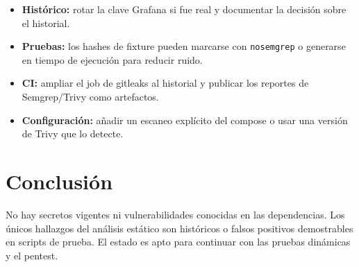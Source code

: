 \documentclass[11pt]{article}
\begin{document}
\begin{itemize}
  \item \textbf{Histórico:} rotar la clave Grafana si fue real y documentar la
  decisión sobre el historial.
  \item \textbf{Pruebas:} los hashes de fixture pueden marcarse con
  \texttt{nosemgrep} o generarse en tiempo de ejecución para reducir ruido.
  \item \textbf{CI:} ampliar el job de gitleaks al historial y publicar los
  reportes de Semgrep/Trivy como artefactos.
  \item \textbf{Configuración:} añadir un escaneo explícito del compose o usar
  una versión de Trivy que lo detecte.
\end{itemize}

\section{Conclusión}

No hay secretos vigentes ni vulnerabilidades conocidas en las dependencias. Los
únicos hallazgos del análisis estático son históricos o falsos positivos
demostrables en scripts de prueba. El estado es apto para continuar con las
pruebas dinámicas y el pentest.
\end{document}
